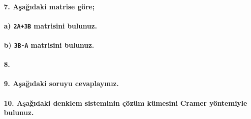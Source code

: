 \documentclass[
]{article}
\begin{document}
\paragraph{\texorpdfstring{\textbf{7.} Aşağıdaki matrise
göre;}{7. Aşağıdaki matrise göre;}}\label{aux15faux11fux131daki-matrise-guxf6re}

\paragraph{\texorpdfstring{a) \texttt{2A+3B} matrisini
bulunuz.}{a) 2A+3B matrisini bulunuz.}}\label{a-2a3b-matrisini-bulunuz.}

\paragraph{\texorpdfstring{b) \texttt{3B-A} matrisini
bulunuz.}{b) 3B-A matrisini bulunuz.}}\label{b-3b-a-matrisini-bulunuz.}

\paragraph{\texorpdfstring{\textbf{8.} {}}{8. }}\label{section}

\paragraph{\texorpdfstring{\textbf{9.} Aşağıdaki soruyu
cevaplayınız.}{9. Aşağıdaki soruyu cevaplayınız.}}\label{aux15faux11fux131daki-soruyu-cevaplayux131nux131z.}

\paragraph{\texorpdfstring{\textbf{10.} Aşağıdaki denklem sisteminin
çözüm kümesini Cramer yöntemiyle
bulunuz.}{10. Aşağıdaki denklem sisteminin çözüm kümesini Cramer yöntemiyle bulunuz.}}\label{aux15faux11fux131daki-denklem-sisteminin-uxe7uxf6zuxfcm-kuxfcmesini-cramer-yuxf6ntemiyle-bulunuz.}
\end{document}
